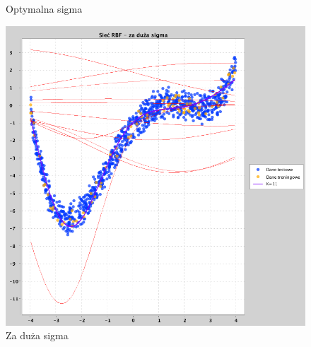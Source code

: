 \documentclass[a4paper, portrait,11pt]{article}
\begin{document}
\begin{figure}[!htb]
\begin{minipage}{0.33\textwidth}
    \caption{\label{fig:2optimalderivative}Optymalna sigma}
  \end{minipage}
  \begin{minipage}{0.33\textwidth}
    \centering
    \includegraphics[width=1\linewidth]{../data/approximation3/2/derivatives/big.png}
    \caption{\label{fig:2bigderivative}Za duża sigma}
  \end{minipage}\hfill
\end{figure}
\end{document}
